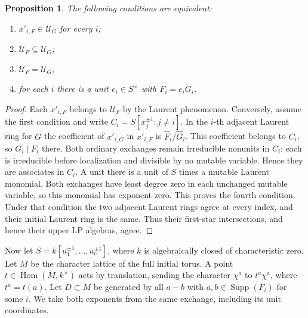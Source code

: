 \documentclass[11pt,reqno]{amsart}
\numberwithin{equation}{section}
\newtheorem{proposition}[theorem]{Proposition}
\theoremstyle{definition}
\theoremstyle{remark}
\DeclareMathOperator{\Supp}{Supp}
\begin{document}
\begin{proposition}\label{prop:marked-exchange-rigidity}
The following conditions are equivalent:
\begin{enumerate}
\item \(x'_{i,F}\in\mathcal U_G\) for every \(i\);
\item \(\mathcal U_F\subseteq\mathcal U_G\);
\item \(\mathcal U_F=\mathcal U_G\);
\item for each \(i\) there is a unit \(e_i\in S^\times\) with
      \(F_i=e_iG_i\).
\end{enumerate}
\end{proposition}
\begin{proof}
Each \(x'_{i,F}\) belongs to \(\mathcal U_F\) by the Laurent
phenomenon. Conversely, assume the first condition and write
\(C_i=S[x_j^{\pm1}:j\ne i]\). In the \(i\)-th adjacent Laurent
ring for \(G\) the coefficient of \(x'_{i,G}\) in \(x'_{i,F}\) is
\(\widehat F_i/\widehat G_i\). This coefficient belongs to \(C_i\), so
\(G_i\mid F_i\) there. Both ordinary exchanges remain
irreducible nonunits in \(C_i\): each is irreducible before
localization and divisible by no mutable variable. Hence they
are associates in \(C_i\). A unit there is a unit of \(S\) times
a mutable Laurent monomial. Both exchanges have least degree zero
in each unchanged mutable variable, so this monomial has exponent
zero. This proves the fourth condition. Under that condition the
two adjacent Laurent rings agree at every index, and their initial
Laurent ring is the same. Thus their first-star intersections, and
hence their upper LP algebras, agree.
\end{proof}

Now let \(S=k[u_1^{\pm1},\ldots,u_c^{\pm1}]\), where \(k\) is
algebraically closed of characteristic zero. Let \(M\) be the
character lattice of the full initial torus. A point
\(t\in\operatorname{Hom}(M,k^\times)\) acts by translation,
sending the character \(\chi^a\) to \(t^a\chi^a\), where \(t^a=t(a)\).
Let \(D\subset M\) be generated by all
\(a-b\) with \(a,b\in\Supp(F_i)\) for some \(i\). We take both
exponents from the same exchange, including its unit
coordinates.
\end{document}

